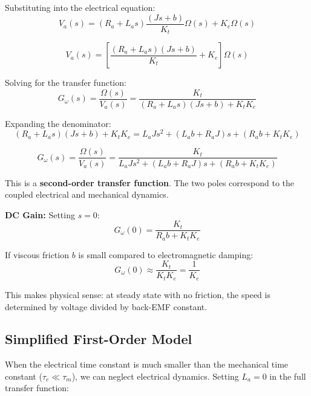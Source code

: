 Substituting into the electrical equation:
\begin{equation}
    V_a(s) = (R_a + L_a s) \frac{(Js + b)}{K_t} \Omega(s) + K_e \Omega(s)
\end{equation}

\begin{equation}
    V_a(s) = \left[ \frac{(R_a + L_a s)(Js + b)}{K_t} + K_e \right] \Omega(s)
\end{equation}

Solving for the transfer function:
\begin{equation}
    G_\omega(s) = \frac{\Omega(s)}{V_a(s)} = \frac{K_t}{(R_a + L_a s)(Js + b) + K_t K_e}
\end{equation}

Expanding the denominator:
\begin{equation}
    (R_a + L_a s)(Js + b) + K_t K_e = L_a J s^2 + (L_a b + R_a J) s + (R_a b + K_t K_e)
\end{equation}

\begin{equation}
    \boxed{G_\omega(s) = \frac{\Omega(s)}{V_a(s)} = \frac{K_t}{L_a J s^2 + (L_a b + R_a J) s + (R_a b + K_t K_e)}}
    \label{eq:motor_tf_full}
\end{equation}

This is a \textbf{second-order transfer function}. The two poles correspond to the coupled electrical and mechanical dynamics.

\textbf{DC Gain:} Setting $s = 0$:
\begin{equation}
    G_\omega(0) = \frac{K_t}{R_a b + K_t K_e}
\end{equation}

If viscous friction $b$ is small compared to electromagnetic damping:
\begin{equation}
    G_\omega(0) \approx \frac{K_t}{K_t K_e} = \frac{1}{K_e}
\end{equation}

This makes physical sense: at steady state with no friction, the speed is determined by voltage divided by back-EMF constant.

\subsection{Simplified First-Order Model}

When the electrical time constant is much smaller than the mechanical time constant ($\tau_e \ll \tau_m$), we can neglect electrical dynamics. Setting $L_a = 0$ in the full transfer function:


